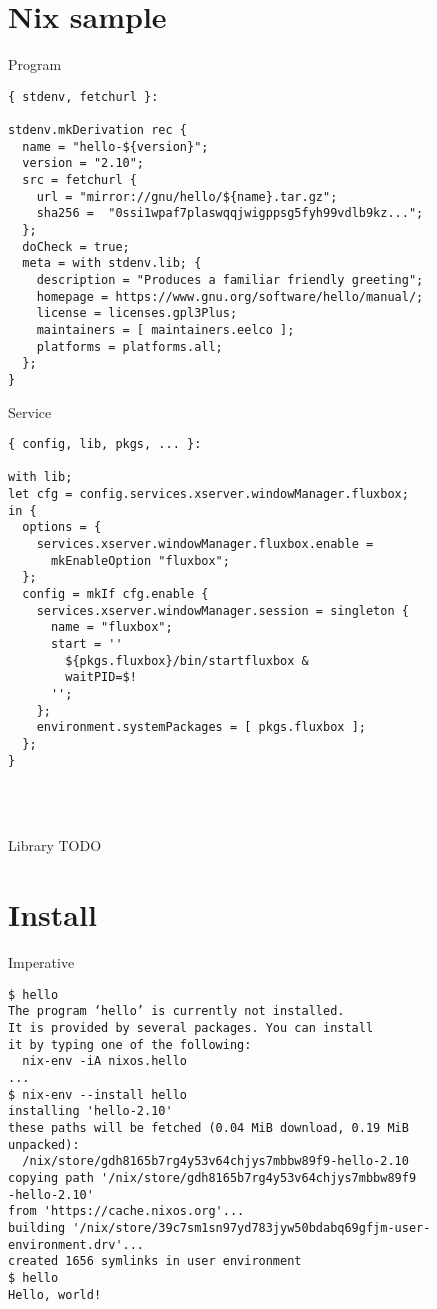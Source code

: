\documentclass[smaller]{beamer}
\begin{document}
\section{Nix sample}
\label{sec:org8a1540f}
\begin{block}{Program}
\begin{verbatim}
{ stdenv, fetchurl }:

stdenv.mkDerivation rec {
  name = "hello-${version}";
  version = "2.10";
  src = fetchurl {
    url = "mirror://gnu/hello/${name}.tar.gz";
    sha256 =  "0ssi1wpaf7plaswqqjwigppsg5fyh99vdlb9kz...";
  };
  doCheck = true;
  meta = with stdenv.lib; {
    description = "Produces a familiar friendly greeting";
    homepage = https://www.gnu.org/software/hello/manual/;
    license = licenses.gpl3Plus;
    maintainers = [ maintainers.eelco ];
    platforms = platforms.all;
  };
}
\end{verbatim}
\end{block}

\begin{block}{Service}
\begin{verbatim}
{ config, lib, pkgs, ... }:

with lib;
let cfg = config.services.xserver.windowManager.fluxbox;
in {
  options = {
    services.xserver.windowManager.fluxbox.enable =
      mkEnableOption "fluxbox";
  };
  config = mkIf cfg.enable {
    services.xserver.windowManager.session = singleton {
      name = "fluxbox";
      start = ''
        ${pkgs.fluxbox}/bin/startfluxbox &
        waitPID=$!
      '';
    };
    environment.systemPackages = [ pkgs.fluxbox ];
  };
}
\end{verbatim}

\hfill\\
\hfill\\
\end{block}

\begin{block}{Library}
TODO\\
\end{block}

\section{Install}
\label{sec:org4ce68b6}

\begin{block}{Imperative}
\begin{verbatim}
$ hello
The program ‘hello’ is currently not installed.
It is provided by several packages. You can install
it by typing one of the following:
  nix-env -iA nixos.hello
...
$ nix-env --install hello
installing 'hello-2.10'
these paths will be fetched (0.04 MiB download, 0.19 MiB
unpacked):
  /nix/store/gdh8165b7rg4y53v64chjys7mbbw89f9-hello-2.10
copying path '/nix/store/gdh8165b7rg4y53v64chjys7mbbw89f9
-hello-2.10'
from 'https://cache.nixos.org'...
building '/nix/store/39c7sm1sn97yd783jyw50bdabq69gfjm-user-
environment.drv'...
created 1656 symlinks in user environment
$ hello
Hello, world!
\end{verbatim}

\hfill\\
\hfill\\
\end{block}
\end{document}
